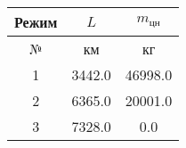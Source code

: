 \begin{tabular}{|c|c|c|}
\hline
Режим & $L$ & $m_{цн}$ \\ 
\hline
№ & км & кг \\ 
\hline
1 & 3442.0 & 46998.0 \\ 
\hline
2 & 6365.0 & 20001.0 \\ 
\hline
3 & 7328.0 & 0.0 \\ 
\hline
\end{tabular}